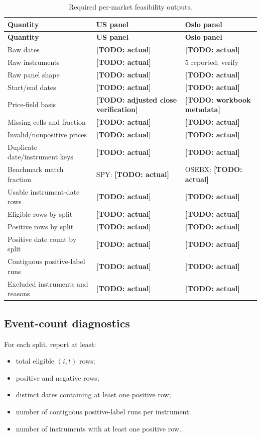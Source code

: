 \documentclass[11pt,a4paper]{article}
\newcommand{\todo}[1]{\textcolor{red!75!black}{\textbf{[TODO: #1]}}}
\begin{document}
\begin{longtable}{p{4.0cm}p{4.1cm}p{5.7cm}}
\caption{Required per-market feasibility outputs.}\label{tab:feasibility}\\
\toprule
\textbf{Quantity} & \textbf{US panel} & \textbf{Oslo panel}\\
\midrule
\endfirsthead
\toprule
\textbf{Quantity} & \textbf{US panel} & \textbf{Oslo panel}\\
\midrule
\endhead
Raw dates & \todo{actual} & \todo{actual}\\
Raw instruments & \todo{actual} & 5 reported; verify\\
Raw panel shape & \todo{actual} & \todo{actual}\\
Start/end dates & \todo{actual} & \todo{actual}\\
Price-field basis & \todo{adjusted close verification} & \todo{workbook metadata}\\
Missing cells and fraction & \todo{actual} & \todo{actual}\\
Invalid/nonpositive prices & \todo{actual} & \todo{actual}\\
Duplicate date/instrument keys & \todo{actual} & \todo{actual}\\
Benchmark match fraction & SPY: \todo{actual} & OSEBX: \todo{actual}\\
Usable instrument-date rows & \todo{actual} & \todo{actual}\\
Eligible rows by split & \todo{actual} & \todo{actual}\\
Positive rows by split & \todo{actual} & \todo{actual}\\
Positive date count by split & \todo{actual} & \todo{actual}\\
Contiguous positive-label runs & \todo{actual} & \todo{actual}\\
Excluded instruments and reasons & \todo{actual} & \todo{actual}\\
\bottomrule
\end{longtable}

\subsection{Event-count diagnostics}

For each split, report at least:
\begin{itemize}
  \item total eligible $(i,t)$ rows;
  \item positive and negative rows;
  \item distinct dates containing at least one positive row;
  \item number of contiguous positive-label runs per instrument;
  \item number of instruments with at least one positive row.
\end{itemize}
\end{document}
